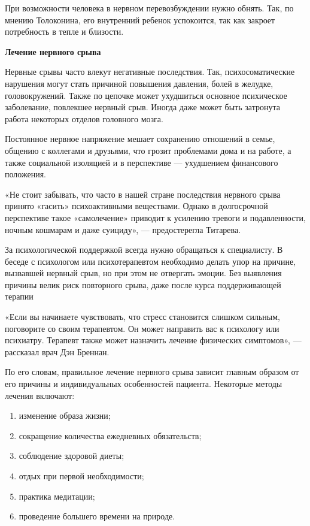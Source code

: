 При возможности человека в нервном перевозбуждении нужно обнять. Так, по мнению Толоконина, его внутренний ребенок успокоится, так как закроет потребность в тепле и близости.

\textbf{Лечение нервного срыва}

Нервные срывы часто влекут негативные последствия. Так, психосоматические нарушения могут стать причиной повышения давления, болей в желудке, головокружений. Также по цепочке может ухудшиться основное психическое заболевание, повлекшее нервный срыв. Иногда даже может быть затронута работа некоторых отделов головного мозга.

Постоянное нервное напряжение мешает сохранению отношений в семье, общению с коллегами и друзьями, что грозит проблемами дома и на работе, а также социальной изоляцией и в перспективе — ухудшением финансового положения.

«Не стоит забывать, что часто в нашей стране последствия нервного срыва принято «гасить» психоактивными веществами. Однако в долгосрочной перспективе такое «самолечение» приводит к усилению тревоги и подавленности, ночным кошмарам и даже суициду», — предостерегла Титарева.

\begin{framed}
    \begin{center}
        За психологической поддержкой всегда нужно обращаться к специалисту. В беседе с психологом или психотерапевтом необходимо делать упор на причине, вызвавшей нервный срыв, но при этом не отвергать эмоции. Без выявления причины велик риск повторного срыва, даже после курса поддерживающей терапии
    \end{center}
\end{framed}

«Если вы начинаете чувствовать, что стресс становится слишком сильным, поговорите со своим терапевтом. Он может направить вас к психологу или психиатру. Терапевт также может назначить лечение физических симптомов», — рассказал врач Дэн Бреннан.

По его словам, правильное лечение нервного срыва зависит главным образом от его причины и индивидуальных особенностей пациента. Некоторые методы лечения включают:

\begin{enumerate}
    \item изменение образа жизни;
    \item сокращение количества ежедневных обязательств;
    \item соблюдение здоровой диеты;
    \item отдых при первой необходимости;
    \item практика медитации;
    \item проведение большего времени на природе.
\end{enumerate}

